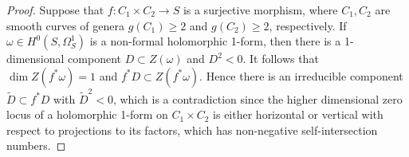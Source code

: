 \documentclass[a4paper,12pt,reqno]{amsart}
\theoremstyle{question}
\theoremstyle{definition}
\theoremstyle{remark}
\theoremstyle{cited}
\theoremstyle{citeddef}
\begin{document}
 
\begin{proof}
    Suppose that $f\colon C_1\times C_2\to S$ is a surjective morphism, where $C_1,C_2$ are smooth curves of genera $g(C_1)\geq 2$ and $g(C_2)\geq 2$, respectively. If $\omega\in H^0(S, \Omega_S^1)$ is a non-formal holomorphic 1-form, then there is a 1-dimensional component  $D\subset Z(\omega)$ and $D^2<0$. It follows that $\dim Z(f^{\ast}\omega)=1$ and $f^{\ast}D\subset Z(f^{\ast}\omega)$. Hence there is an irreducible component $\widetilde{D}\subset f^{\ast}D$ with $\widetilde{D}^2<0$, which is a contradiction since the higher dimensional zero locus of a holomorphic 1-form on $C_1\times C_2$ is either horizontal or vertical with respect to  projections to its factors, which has non-negative self-intersection numbers.
\end{proof}

































 




\end{document}
